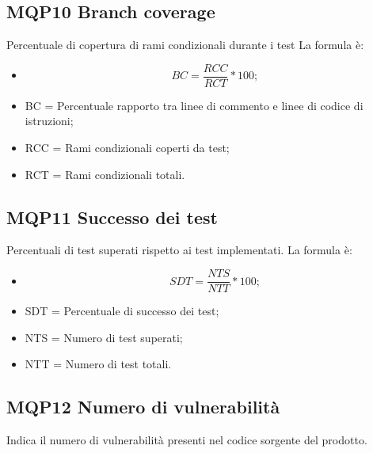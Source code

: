 \subsection{MQP10 Branch coverage}
Percentuale di copertura di rami condizionali durante i test
La formula è:
\begin{itemize}
  \item[] \[BC = \frac{RCC}{RCT} * 100 ;\]
  \item BC = Percentuale rapporto tra linee di commento e linee di codice di istruzioni;
  \item RCC = Rami condizionali coperti da test;
  \item RCT = Rami condizionali totali.
  \end{itemize}


\subsection{MQP11 Successo dei test}
Percentuali di test superati rispetto ai test implementati.
La formula è:
\begin{itemize}
  \item[] \[SDT = \frac{NTS}{NTT} * 100 ;\]
  \item SDT = Percentuale di successo dei test;
  \item NTS = Numero di test superati;
  \item NTT = Numero di test totali.
  \end{itemize}

\subsection{MQP12 Numero di vulnerabilità}
Indica il numero di vulnerabilità presenti nel codice sorgente del prodotto.


